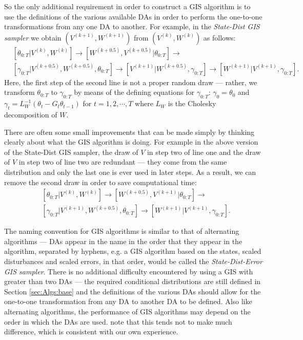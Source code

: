\documentclass{article}
\begin{document}
So the only additional requirement in order to construct a GIS algorithm is to use the definitions of the various available DAs in order to perform the one-to-one transformations from any one DA to another. For example, in the {\it State-Dist GIS sampler} we obtain $(V^{(k+1)},W^{(k+1)})$ from $(V^{(k)},W^{(k)})$ as follows:
\begin{align*}
&[\theta_{0:T}|V^{(k)},W^{(k)}] \to [W^{(k+0.5)},V^{(k+0.5)}|\theta_{0:T}] \to\\
&[\gamma_{0:T}|V^{(k+0.5)},W^{(k+0.5)},\theta_{0:T}] \to [V^{(k+1)}|W^{(k+0.5)},\gamma_{0:T}] \to [W^{(k+1)}|V^{(k+1)},\gamma_{0:T}].
\end{align*}
Here, the first step of the second line is not a proper random draw --- rather, we transform $\theta_{0:T}$ to $\gamma_{0:T}$ by means of the defining equations for $\gamma_{0:T}$: $\gamma_0=\theta_0$ and $\gamma_t = L_W^{-1}(\theta_t - G_t\theta_{t-1})$ for $t=1,2,\cdots,T$ where $L_W$ is the Cholesky decomposition of $W$. 

There are often some small improvements that can be made simply by thinking clearly about what the GIS algorithm is doing. For example in the above version of the State-Dist GIS sampler, the draw of $V$ in step two of line one and the draw of $V$ in step two of line two are redundant --- they come from the same distribution and only the last one is ever used in later steps. As a result, we can remove the second draw in order to save computational time:
\begin{align*}
&[\theta_{0:T}|V^{(k)},W^{(k)}] \to [W^{(k+0.5)},V^{(k+1)}|\theta_{0:T}] \to\\
&[\gamma_{0:T}|V^{(k+1)},W^{(k+0.5)},\theta_{0:T}] \to 
[W^{(k+1)}|V^{(k+1)},\gamma_{0:T}].
\end{align*}

The naming convention for GIS algorithms is similar to that of alternating algorithms --- DAs appear in the name in the order that they appear in the algorithm, separated by hyphens, e.g. a GIS algorithm based on the states, scaled disturbances and scaled errors, in that order, would be called the {\it State-Dist-Error GIS sampler}. There is no additional difficulty encountered by using a GIS with greater than two DAs --- the required conditional distributions are still defined in Section \ref{sec:Algs:base} and the definitions of the various DAs should allow for the one-to-one transformation from any DA to another DA to be defined.  Also like alternating algorithms, the performance of GIS algorithms may depend on the order in which the DAs are used.  note that this tends not to make much difference, which is consistent with our own experience.
\end{document}
